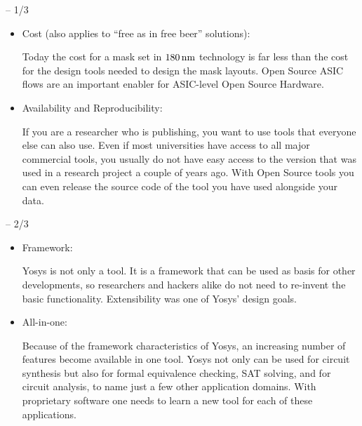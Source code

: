 \begin{frame}{\subsecname{} -- 1/3}
\begin{itemize}
\item Cost (also applies to ``free as in free beer'' solutions): \smallskip\par
Today the cost for a mask set in $\unit[180]{nm}$ technology is far less than
the cost for the design tools needed to design the mask layouts. Open Source
ASIC flows are an important enabler for ASIC-level Open Source Hardware.

\bigskip
\item Availability and Reproducibility: \smallskip\par
If you are a researcher who is publishing, you want to use tools that everyone
else can also use. Even if most universities have access to all major
commercial tools, you usually do not have easy access to the version that was
used in a research project a couple of years ago. With Open Source tools you
can even release the source code of the tool you have used alongside your data.
\end{itemize}
\end{frame}

\begin{frame}{\subsecname{} -- 2/3}
\begin{itemize}
\item Framework: \smallskip\par
Yosys is not only a tool. It is a framework that can be used as basis for other
developments, so researchers and hackers alike do not need to re-invent the
basic functionality. Extensibility was one of Yosys' design goals.

\bigskip
\item All-in-one: \smallskip\par
Because of the framework characteristics of Yosys, an increasing number of features
become available in one tool. Yosys not only can be used for circuit synthesis but
also for formal equivalence checking, SAT solving, and for circuit analysis, to
name just a few other application domains. With proprietary software one needs to
learn a new tool for each of these applications.
\end{itemize}
\end{frame}

